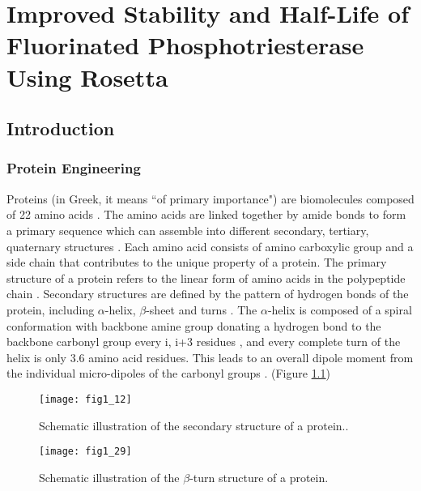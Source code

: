 \chapter{Improved Stability and Half-Life of Fluorinated Phosphotriesterase
Using Rosetta} 
\label{chap:uaa}

\begin{refsection}

\section{Introduction}

\subsection{Protein Engineering}
\label{sec:protein-engineering}

Proteins (in Greek, it means “of primary importance") are biomolecules composed
of 22 amino acids \cite{Nelson2005}. The amino acids are linked together by
amide bonds to form a primary sequence which can assemble into different
secondary, tertiary, quaternary structures \cite{Berg2002a}. Each amino acid
consists of amino carboxylic group and a side chain that contributes to the
unique property of a protein. The primary structure of a protein refers to the
linear form of amino acids in the polypeptide chain \cite{Sanger1945}.
Secondary structures are defined by the pattern of hydrogen bonds of the
protein, including $\alpha$-helix, $\beta$-sheet and turns \cite{PAULING1951}.
The $\alpha$-helix is composed of a spiral conformation with backbone amine
group donating a hydrogen bond to the backbone carbonyl group every i, i+3
residues \cite{Kabsch1983}, and every complete turn of the helix is only 3.6
amino acid residues. This leads to an overall dipole moment from the individual
micro-dipoles of the carbonyl groups \cite{Hol1978}. (Figure
\ref{fig:alpha-helix-stabilization})
\begin{figure}[htbp] 
    \centering \texttt{[image: fig1\_12]}
    \caption[Schematic illustration of the secondary structure of a
    protein.]{Schematic illustration of the secondary structure of a
        protein.\cite{Berg2002a}.} 
    \label{fig:alpha-helix-stabilization}
\end{figure}
\begin{figure}[p] \centering \texttt{[image: fig1\_29]}
    \caption[Schematic illustration of the $\beta$-turn structure of a
    protein.]{Schematic illustration of the $\beta$-turn structure of a
        protein\cite{Nemethy1972}.} 
    \label{fig:beta-turn}
\end{figure}


\end{refsection}
